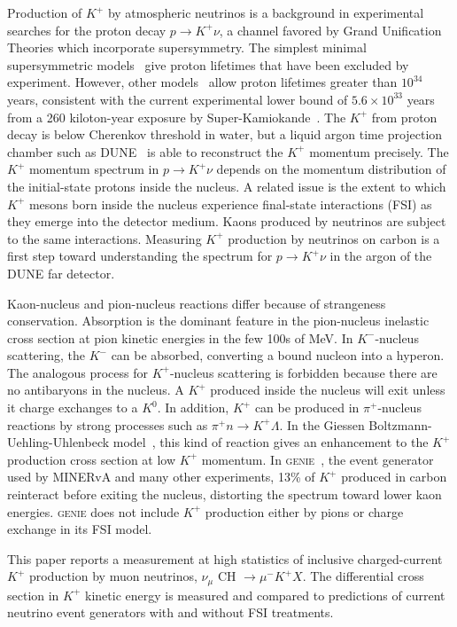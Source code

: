 \documentclass[aps,prl,preprint,showpacs,superscriptaddress,nofootinbib,floatfix,linenumbers]{revtex4}
\newcommand{\minerva}{MINERvA\xspace}
\newcommand{\dune}{DUNE\xspace}
\newcommand{\genie}{\textsc{genie}\xspace}
\newcommand{\pknu}{\ensuremath{p \rightarrow K^{+} \nu}\xspace}
\newcommand{\pip}{\ensuremath{\pi^{+}}\xspace}
\newcommand{\kp}{\ensuremath{K^{+}}\xspace}
\newcommand{\km}{\ensuremath{K^{-}}\xspace}
\newcommand{\kz}{\ensuremath{K^{0}}\xspace}
\newcommand{\mum}{\ensuremath{\mu^{-}}\xspace}
\begin{document}
Production of \kp by atmospheric neutrinos is a background in experimental searches for the proton decay \pknu, a channel favored by Grand Unification Theories which incorporate supersymmetry. The simplest minimal supersymmetric models~\cite{susygut1, susygut2} give proton lifetimes that have been excluded by experiment. However, other models~\cite{susygut3, susygut4, susygut5, susygut6, susygut7, susygut8} allow proton lifetimes greater than $10^{34}$ years, consistent with the current experimental lower bound of $5.6 \times 10^{33}$ years from a 260 kiloton-year exposure by Super-Kamiokande~\cite{skpknu}. The \kp from proton decay is below Cherenkov threshold in water, but a liquid argon time projection chamber such as DUNE~\cite{dune} is able to reconstruct the \kp momentum precisely. The \kp momentum spectrum in \pknu depends on the momentum distribution of the initial-state protons inside the nucleus. A related issue is the extent to which \kp mesons born inside the nucleus experience final-state interactions (FSI) as they emerge into the detector medium. Kaons produced by neutrinos are subject to the same interactions. Measuring \kp production by neutrinos on carbon is a first step toward understanding the spectrum for \pknu in the argon of the \dune far detector.

Kaon-nucleus and pion-nucleus reactions differ because of strangeness conservation. Absorption is the dominant feature in the pion-nucleus inelastic cross section at pion kinetic energies in the few 100s of MeV. In \km-nucleus scattering, the \km can be absorbed, converting a bound nucleon into a hyperon. The analogous process for \kp-nucleus scattering is forbidden because there are no antibaryons in the nucleus. A \kp produced inside the nucleus will exit unless it charge exchanges to a \kz. In addition, \kp can be produced in \pip-nucleus reactions by strong processes such as $\pi^{+} n \rightarrow K^{+} \Lambda$. In the Giessen Boltzmann-Uehling-Uhlenbeck model~\cite{gibuu}, this kind of reaction gives an enhancement to the \kp production cross section at low \kp momentum. In \genie~\cite{genieNIM}, the event generator used by \minerva and many other experiments, 13\% of \kp produced in carbon reinteract before exiting the nucleus, distorting the spectrum toward lower kaon energies. \genie does not include \kp production either by pions or charge exchange in its FSI model.

This paper reports a measurement at high statistics of inclusive charged-current \kp production by muon neutrinos, $\nu_{\mu}$ CH $\rightarrow \mum \kp X$. The differential cross section in \kp kinetic energy is measured and compared to predictions of current neutrino event generators with and without FSI treatments.
\end{document}
